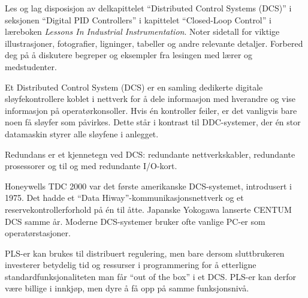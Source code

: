

Les og lag disposisjon av delkapittelet ``Distributed Control Systems (DCS)'' i seksjonen ``Digital PID Controllers'' i kapittelet ``Closed-Loop Control'' i læreboken {\it Lessons In Industrial Instrumentation}. Noter sidetall for viktige illustrasjoner, fotografier, ligninger, tabeller og andre relevante detaljer. Forbered deg på å diskutere begreper og eksempler fra lesingen med lærer og medstudenter.














Et Distributed Control System (DCS) er en samling dedikerte digitale sløyfekontrollere koblet i nettverk for å dele informasjon med hverandre og vise informasjon på operatørkonsoller. Hvis én kontroller feiler, er det vanligvis bare noen få sløyfer som påvirkes. Dette står i kontrast til DDC-systemer, der én stor datamaskin styrer alle sløyfene i anlegget.

\vskip 10pt

Redundans er et kjennetegn ved DCS: redundante nettverkskabler, redundante prosessorer og til og med redundante I/O-kort.

\vskip 10pt

Honeywells TDC 2000 var det første amerikanske DCS-systemet, introdusert i 1975. Det hadde et ``Data Hiway''-kommunikasjonsnettverk og et reservekontrollerforhold på én til åtte. Japanske Yokogawa lanserte CENTUM DCS samme år. Moderne DCS-systemer bruker ofte vanlige PC-er som operatørstasjoner.

\vskip 10pt

PLS-er kan brukes til distribuert regulering, men bare dersom sluttbrukeren investerer betydelig tid og ressurser i programmering for å etterligne standardfunksjonaliteten man får ``out of the box'' i et DCS. PLS-er kan derfor være billige i innkjøp, men dyre å få opp på samme funksjonsnivå.







